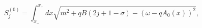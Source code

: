 \begin{equation}
S^{(0)}_j = \int_{x_-}^{x_+} dx \sqrt{m^2 + qB (2j + 1 - \sigma) - 
(\omega - q A_0 (x))^2},
\end{equation}

